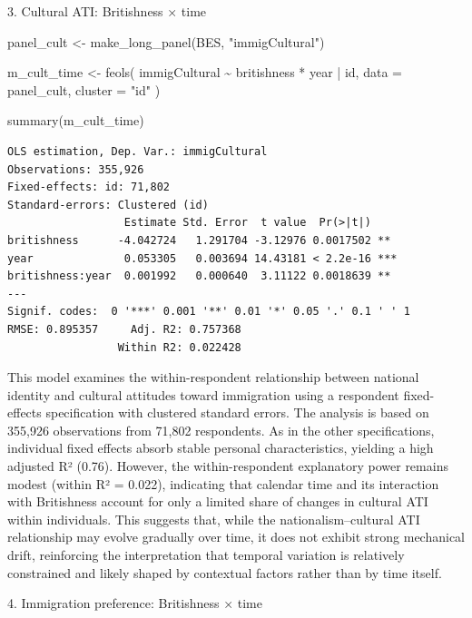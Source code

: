 \documentclass[
  11pt,
  letterpaper,
  DIV=11,
  numbers=noendperiod]{scrartcl}
\newenvironment{Shaded}{\begin{snugshade}}{\end{snugshade}}
\newcommand{\AttributeTok}[1]{\textcolor[rgb]{0.40,0.45,0.13}{#1}}
\newcommand{\FunctionTok}[1]{\textcolor[rgb]{0.28,0.35,0.67}{#1}}
\newcommand{\NormalTok}[1]{\textcolor[rgb]{0.00,0.23,0.31}{#1}}
\newcommand{\OtherTok}[1]{\textcolor[rgb]{0.00,0.23,0.31}{#1}}
\newcommand{\SpecialCharTok}[1]{\textcolor[rgb]{0.37,0.37,0.37}{#1}}
\newcommand{\StringTok}[1]{\textcolor[rgb]{0.13,0.47,0.30}{#1}}
\begin{document}
3. Cultural ATI: Britishness × time

\begin{Shaded}
\begin{Highlighting}[]
\NormalTok{panel\_cult }\OtherTok{\textless{}{-}} \FunctionTok{make\_long\_panel}\NormalTok{(BES, }\StringTok{"immigCultural"}\NormalTok{)}

\NormalTok{m\_cult\_time }\OtherTok{\textless{}{-}} \FunctionTok{feols}\NormalTok{(}
\NormalTok{immigCultural }\SpecialCharTok{\textasciitilde{}}\NormalTok{ britishness }\SpecialCharTok{*}\NormalTok{ year }\SpecialCharTok{|}\NormalTok{ id,}
\AttributeTok{data =}\NormalTok{ panel\_cult,}
\AttributeTok{cluster =} \StringTok{"id"}
\NormalTok{)}

\FunctionTok{summary}\NormalTok{(m\_cult\_time)}
\end{Highlighting}
\end{Shaded}

\begin{verbatim}
OLS estimation, Dep. Var.: immigCultural
Observations: 355,926
Fixed-effects: id: 71,802
Standard-errors: Clustered (id) 
                  Estimate Std. Error  t value  Pr(>|t|)    
britishness      -4.042724   1.291704 -3.12976 0.0017502 ** 
year              0.053305   0.003694 14.43181 < 2.2e-16 ***
britishness:year  0.001992   0.000640  3.11122 0.0018639 ** 
---
Signif. codes:  0 '***' 0.001 '**' 0.01 '*' 0.05 '.' 0.1 ' ' 1
RMSE: 0.895357     Adj. R2: 0.757368
                 Within R2: 0.022428
\end{verbatim}

This model examines the within-respondent relationship between national
identity and cultural attitudes toward immigration using a respondent
fixed-effects specification with clustered standard errors. The analysis
is based on 355,926 observations from 71,802 respondents. As in the
other specifications, individual fixed effects absorb stable personal
characteristics, yielding a high adjusted R² (0.76). However, the
within-respondent explanatory power remains modest (within R² = 0.022),
indicating that calendar time and its interaction with Britishness
account for only a limited share of changes in cultural ATI within
individuals. This suggests that, while the nationalism--cultural ATI
relationship may evolve gradually over time, it does not exhibit strong
mechanical drift, reinforcing the interpretation that temporal variation
is relatively constrained and likely shaped by contextual factors rather
than by time itself.

4. Immigration preference: Britishness × time
\end{document}
